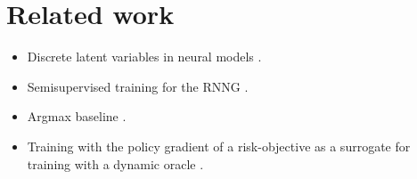 \section{Related work}
\begin{itemize}
  \item Discrete latent variables in neural models \citep{miao2016discrete,yin2018structvae}.
  \item Semisupervised training for the RNNG \citep{cheng2017rnng}.
  \item Argmax baseline \cite{rennie2017argmax}.
  \item Training with the policy gradient of a risk-objective as a surrogate for training with a dynamic oracle \citep{klein2018reinforce}.
\end{itemize}
